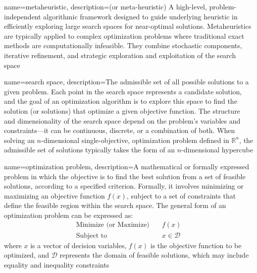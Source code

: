 {
    name=metaheuristic,
    description={(or meta-heuristic) A high-level, problem-independent algorithmic framework designed to guide underlying heuristic in efficiently exploring large search spaces for near-optimal solutions. Metaheuristics are typically applied to complex optimization problems where traditional exact methods are computationally infeasible. They combine stochastic components, iterative refinement, and strategic exploration and exploitation of the search space}
}

{
    name=search space,
    description={The admissible set of all possible solutions to a given problem. Each point in the search space represents a candidate solution, and the goal of an optimization algorithm is to explore this space to find the solution (or solutions) that optimize a given objective function. The structure and dimensionality of the search space depend on the problem's variables and constraints---it can be continuous, discrete, or a combination of both. When solving an $n$-dimensional single-objective, optimization problem defined in $\mathbb{R}^{n}$, the admissible set of solutions typically takes the form of an $n$-dimensional hypercube}
}

{
    name=optimization problem,
    description={A mathematical or formally expressed problem in which the objective is to find the best solution from a set of feasible solutions, according to a specified criterion. Formally, it involves minimizing or maximizing an objective function $f(x)$, subject to a set of constraints that define the feasible region within the search space. The general form of an optimization problem can be expressed as:%
$$
\begin{aligned}
\text{Minimize (or Maximize)} \quad & f(x) \\
\text{Subject to} \quad & x \in \mathcal{D}
\end{aligned}
$$
where $x$ is a vector of decision variables, $f(x)$ is the objective function to be optimized, and $\mathcal{D}$ represents the domain of feasible solutions, which may include equality and inequality constraints}
}
